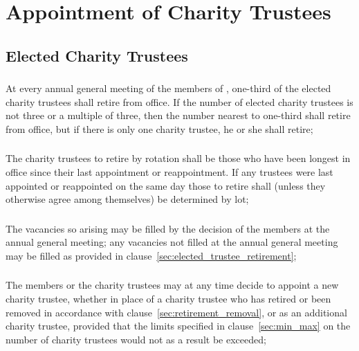 \section{Appointment of Charity Trustees}\label{sec:appointment}

    \subsection{Elected Charity Trustees}

        \subsubsection{}
        At every annual general meeting of the members of \shortname{}, one-third of the elected charity trustees shall retire from office. If the number of elected charity trustees is not three or a multiple of three, then the number nearest to one-third shall retire from office, but if there is only one charity trustee, he or she shall retire;

        \subsubsection{}\label{sec:rotation_retirement}
        The charity trustees to retire by rotation shall be those who have been longest in office since their last appointment or reappointment. If any trustees were last appointed or reappointed on the same day those to retire shall (unless they otherwise agree among themselves) be determined by lot;

        \subsubsection{}\label{sec:trustee_vacancy}
        The vacancies so arising may be  filled by the decision of the members at the annual general meeting; any vacancies not  filled at the annual general meeting may be  filled as provided in clause~\ref{sec:elected_trustee_retirement};

        \subsubsection{}
        The members or the charity trustees may at any time decide to appoint a new charity trustee, whether in place of a charity trustee who has retired or been removed in accordance with clause~\ref{sec:retirement_removal}, or as an additional charity trustee, provided that the limits specified in clause~\ref{sec:min_max} on the number of charity trustees would not as a result be exceeded;

